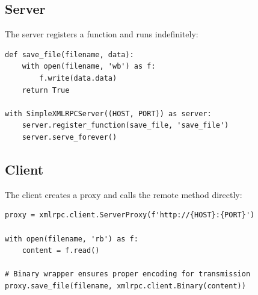 \documentclass{article}
\begin{document}
\subsection{Server}
The server registers a function and runs indefinitely:
\begin{lstlisting}
def save_file(filename, data):
    with open(filename, 'wb') as f:
        f.write(data.data)
    return True

with SimpleXMLRPCServer((HOST, PORT)) as server:
    server.register_function(save_file, 'save_file')
    server.serve_forever()
\end{lstlisting}

\subsection{Client}
The client creates a proxy and calls the remote method directly:
\begin{lstlisting}
proxy = xmlrpc.client.ServerProxy(f'http://{HOST}:{PORT}')

with open(filename, 'rb') as f:
    content = f.read()

# Binary wrapper ensures proper encoding for transmission
proxy.save_file(filename, xmlrpc.client.Binary(content))
\end{lstlisting}
\end{document}
